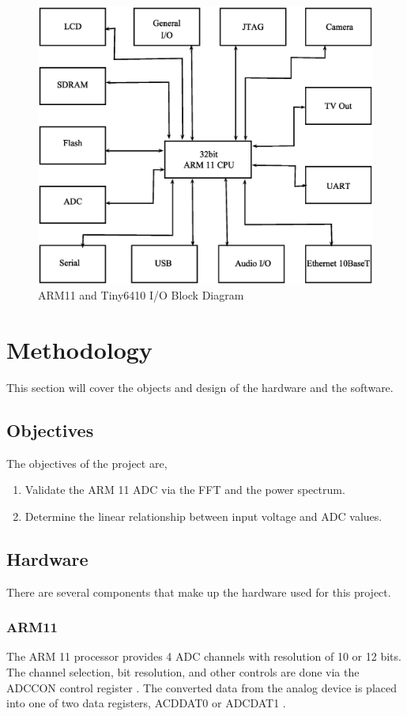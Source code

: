 \documentclass[10pt,conference]{IEEEtran}
\begin{document}
\begin{figure}[ht!]
	\includegraphics[scale=.30]{ARM11BlockDiagram}
	\caption{ARM11 and Tiny6410 I/O Block Diagram}\label{ARM11BlockDiagram}
\end{figure}



%
%
\section{Methodology}
This section will cover the objects and design of the hardware and the software.

\subsection{Objectives}
The objectives of the project are,
\begin{enumerate}
	\item Validate the ARM 11 ADC via the FFT and the power spectrum.
	\item Determine the linear relationship between input voltage and ADC values.
\end{enumerate}

\subsection{Hardware}
There are several components that make up the hardware used for this project.

\subsubsection{ARM11}\label{ARM11HW}
The ARM 11 processor provides 4 ADC channels with resolution of 10 or 12 bits. The channel selection, bit resolution, and other controls are done via the ADCCON control register \cite{Samsung}. The converted data from the analog device is placed into one of two data registers, ACDDAT0 or ADCDAT1 \cite{Samsung}.
\end{document}
